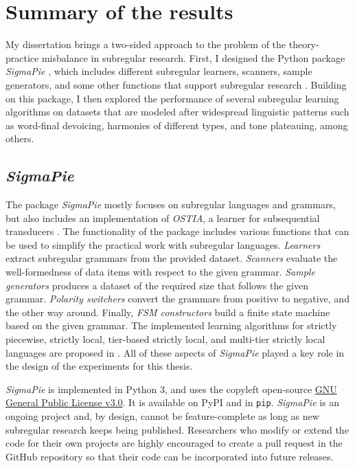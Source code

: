 \section{Summary of the results}

My dissertation brings a two-sided approach to the problem of the theory-practice misbalance in subregular research.
First, I designed the Python package \emph{SigmaPie} \href{https://pypi.org/project/SigmaPie/}{\faCube}, which includes different subregular learners, scanners, sample generators, and some other functions that support subregular research \citep{sigmapie}.
Building on this package, I then explored the performance of several subregular learning algorithms on datasets that are modeled after widespread linguistic patterns such as word-final devoicing, harmonies of different types, and tone plateauing, among others.

\subsection{\emph{SigmaPie} \href{https://pypi.org/project/SigmaPie/}{\faCube}}

The package \emph{SigmaPie} mostly focuses on subregular languages and grammars, but also includes an implementation of \emph{OSTIA}, a learner for subsequential transducers \citep{OncinaEtAl1993,DeLaHiguera2010}.
The functionality of the package includes various functions that can be used to simplify the practical work with subregular languages.
\emph{Learners} extract subregular grammars from the provided dataset.
\emph{Scanners} evaluate the well-formedness of data items with respect to the given grammar.
\emph{Sample generators} produces a dataset of the required size that follows the given grammar.
\emph{Polarity switchers} convert the grammars from positive to negative, and the other way around.
Finally, \emph{FSM constructors} build a finite state machine based on the given grammar.
The implemented learning algorithms for strictly piecewise, strictly local, tier-based strictly local, and multi-tier strictly local languages are proposed in \citep{Heinz-2010-SEL,JardineMcMullin2017,McMullinAksenovaDeSanto2019}.
All of these aspects of \emph{SigmaPie} played a key role in the design of the experiments for this thesis.

\emph{SigmaPie} is implemented in Python 3, and uses the copyleft open-source \href{https://www.gnu.org/licenses/gpl-3.0.en.html}{GNU General Public License v3.0}.
It is available on PyPI and in \texttt{pip}.
\emph{SigmaPie} is an ongoing project and, by design, cannot be feature-complete as long as new subregular research keeps being published.
Researchers who modify or extend the code for their own projects are highly encouraged to create a pull request in the GitHub repository so that their code can be incorporated into future releases.


